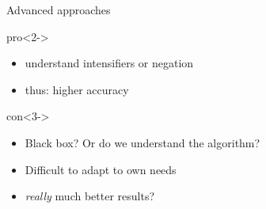 \documentclass{beamer}
\begin{document}
\begin{frame}{Advanced approaches}
	\begin{block}{pro}<2->
		\begin{itemize}
			\item understand intensifiers or negation
			\item thus: higher accuracy
		\end{itemize}
	\end{block}
	\begin{block}{con}<3->
		\begin{itemize}
			\item Black box? Or do we understand the algorithm?
			\item Difficult to adapt to own needs
			\item \emph{really} much better results?
		\end{itemize}
	\end{block}
\end{frame}
\end{document}
